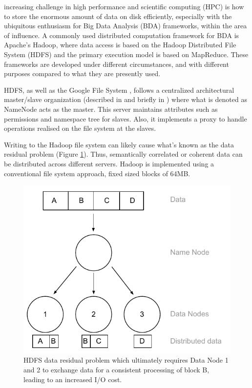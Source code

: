  increasing challenge in high performance and scientific computing (HPC) is how to store the enormous amount of data on disk efficiently, especially with the ubiquitous enthusiasm for Big Data Analysis (BDA) frameworks, within the area of influence. A commonly used distributed computation framework for BDA is Apache's Hadoop\cite{PageHadoop}, where data access is based on the Hadoop Distributed File System (HDFS) \cite{Shvachko:2010:HDF:1913798.1914427} and the primary execution model is based on MapReduce\cite{Dean:2008:MSD:1327452.1327492}. These frameworks are developed under different circumstances, and with different purposes compared to what they are presently used.
\newline

HDFS, as well as the Google File System \cite{Ghemawat:2003:GFS:945445.945450}, follows a centralized architectural master/slave organization (described in \cite{Tanenbaum:2006:DSP:1202502} and briefly in \cite{Wilkinson:1998:PPT:289352}) where what is denoted as NameNode acts as the master. This server maintains attributes such as permissions and namespace tree for slaves. Also, it implements a proxy to handle operations realised on the file system at the slaves. 
\newline

Writing to the Hadoop file system can likely cause what's known as the data residual problem (Figure \ref{fig:data-residual}). Thus, semantically correlated or coherent data can be distributed across different servers. Hadoop is implemented using a conventional file system approach, \ie fixed sized blocks of 64MB. 
\newpage

\begin{figure}
	\centering
	\hspace*{15mm}
	\includegraphics[scale=0.8]{pdf/data-residual.pdf}
	\caption[HDFS data residual problem]{HDFS data residual problem which ultimately requires Data Node 1 and 2 to exchange data for a consistent processing of block B, leading to an increased I/O cost. \label{fig:data-residual}}
\end{figure}

